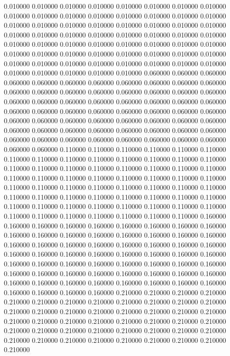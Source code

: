 0.010000
0.010000
0.010000
0.010000
0.010000
0.010000
0.010000
0.010000
0.010000
0.010000
0.010000
0.010000
0.010000
0.010000
0.010000
0.010000
0.010000
0.010000
0.010000
0.010000
0.010000
0.010000
0.010000
0.010000
0.010000
0.010000
0.010000
0.010000
0.010000
0.010000
0.010000
0.010000
0.010000
0.010000
0.010000
0.010000
0.010000
0.010000
0.010000
0.010000
0.010000
0.010000
0.010000
0.010000
0.010000
0.010000
0.010000
0.010000
0.010000
0.010000
0.010000
0.010000
0.010000
0.010000
0.010000
0.010000
0.010000
0.010000
0.010000
0.010000
0.010000
0.060000
0.060000
0.060000
0.060000
0.060000
0.060000
0.060000
0.060000
0.060000
0.060000
0.060000
0.060000
0.060000
0.060000
0.060000
0.060000
0.060000
0.060000
0.060000
0.060000
0.060000
0.060000
0.060000
0.060000
0.060000
0.060000
0.060000
0.060000
0.060000
0.060000
0.060000
0.060000
0.060000
0.060000
0.060000
0.060000
0.060000
0.060000
0.060000
0.060000
0.060000
0.060000
0.060000
0.060000
0.060000
0.060000
0.060000
0.060000
0.060000
0.060000
0.060000
0.060000
0.060000
0.060000
0.060000
0.060000
0.060000
0.060000
0.060000
0.060000
0.060000
0.110000
0.110000
0.110000
0.110000
0.110000
0.110000
0.110000
0.110000
0.110000
0.110000
0.110000
0.110000
0.110000
0.110000
0.110000
0.110000
0.110000
0.110000
0.110000
0.110000
0.110000
0.110000
0.110000
0.110000
0.110000
0.110000
0.110000
0.110000
0.110000
0.110000
0.110000
0.110000
0.110000
0.110000
0.110000
0.110000
0.110000
0.110000
0.110000
0.110000
0.110000
0.110000
0.110000
0.110000
0.110000
0.110000
0.110000
0.110000
0.110000
0.110000
0.110000
0.110000
0.110000
0.110000
0.110000
0.110000
0.110000
0.110000
0.110000
0.110000
0.110000
0.160000
0.160000
0.160000
0.160000
0.160000
0.160000
0.160000
0.160000
0.160000
0.160000
0.160000
0.160000
0.160000
0.160000
0.160000
0.160000
0.160000
0.160000
0.160000
0.160000
0.160000
0.160000
0.160000
0.160000
0.160000
0.160000
0.160000
0.160000
0.160000
0.160000
0.160000
0.160000
0.160000
0.160000
0.160000
0.160000
0.160000
0.160000
0.160000
0.160000
0.160000
0.160000
0.160000
0.160000
0.160000
0.160000
0.160000
0.160000
0.160000
0.160000
0.160000
0.160000
0.160000
0.160000
0.160000
0.160000
0.160000
0.160000
0.160000
0.160000
0.160000
0.210000
0.210000
0.210000
0.210000
0.210000
0.210000
0.210000
0.210000
0.210000
0.210000
0.210000
0.210000
0.210000
0.210000
0.210000
0.210000
0.210000
0.210000
0.210000
0.210000
0.210000
0.210000
0.210000
0.210000
0.210000
0.210000
0.210000
0.210000
0.210000
0.210000
0.210000
0.210000
0.210000
0.210000
0.210000
0.210000
0.210000
0.210000
0.210000
0.210000
0.210000
0.210000
0.210000
0.210000
0.210000
